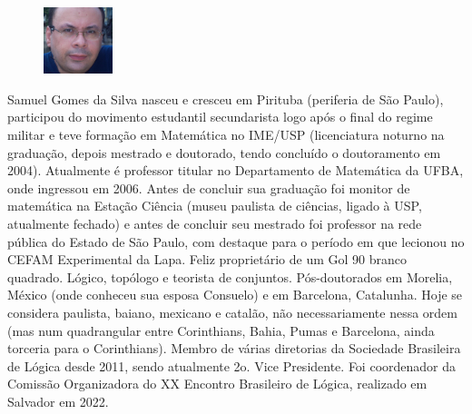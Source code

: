 \documentclass{hipatia}
\begin{document}
\vfill

\newpage

\begin{figure}
\vspace{-10pt}
  \includegraphics[width=2cm]{Samuel.jpeg}
\end{figure}\noindent
Samuel Gomes da Silva nasceu e cresceu em Pirituba 
(periferia de São Paulo), participou do movimento 
estudantil secundarista logo após o final do 
regime militar e teve formação em Matemática no 
IME/USP (licenciatura noturno na graduação, 
depois mestrado e doutorado, tendo concluído o 
doutoramento em 2004). Atualmente é professor 
titular no Departamento de Matemática da UFBA, 
onde ingressou em 2006.  Antes de concluir sua 
graduação foi monitor de matemática na Estação 
Ciência (museu paulista de ciências, ligado à USP, 
atualmente fechado) e antes de concluir seu mestrado 
foi professor na rede pública do Estado de São Paulo, 
com destaque para o período em que lecionou no CEFAM 
Experimental da Lapa. Feliz  proprie\-tário de um Gol 90 
branco quadrado. Lógico, topólogo e teorista de conjuntos. 
Pós-doutorados em Morelia, México (onde conheceu sua 
esposa Consuelo) e em Barcelona, Catalunha.  
Hoje se considera paulista, baiano, mexicano e 
catalão, não necessariamente nessa ordem (mas 
num quadrangular entre Corinthians, Bahia, Pumas e 
Barcelona, ainda torceria para o Corinthians). 
Membro de várias diretorias  da Sociedade Brasileira 
de Lógica desde 2011, sendo atualmente 2o. Vice Presidente. 
Foi coordenador da Comissão Organizadora do XX Encontro 
Brasileiro de Lógica, realizado em Salvador em 2022.

\vspace{1cm}
\end{document}
